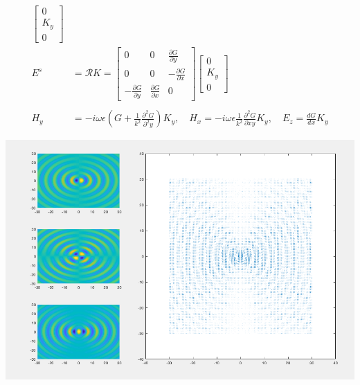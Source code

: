 \documentclass{article}
\newcommand{\0}{\varnothing}
\begin{document}
\begin{minipage}{0.5\textwidth}
\begin{align*}
        \left[ \begin{array}{c} 
        0 \\ K_y \\ 0 \end{array} \right]\\
         E^s &= \mathcal{R} K = \left[ \begin{array}{ccc} 0 & 0 & \frac{\partial G}{\partial y}\\ 
                            0 & 0 &-\frac{\partial G}{\partial x}\\ 
                            -\frac{\partial G}{\partial y} &\frac{\partial G}{\partial x} &0 \end{array} \right]
        \left[ \begin{array}{c} 
        0 \\ K_y \\ 0 \end{array} \right]\\
        \ \\
        H_y &= -i\omega\epsilon \left( G + \frac{1}{k^2}\frac{\partial^2 G}{\partial^2 y} \right) K_y, \quad  H_x = -i\omega\epsilon \frac{1}{k^2}\frac{\partial^2 G}{\partial xy} K_y, \quad E_z = \frac{dG}{dx} K_y
\end{align*}
\end{minipage}
\begin{minipage}{0.5\textwidth}
{\centering
\includegraphics[width=1\columnwidth]{figures/KyDipole}
}
\end{minipage}
\end{document}
